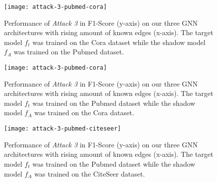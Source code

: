   \begin{figure}[h]
      \begin{center}
          \texttt{[image: attack-3-pubmed-cora]}
          \caption[Attack 3 - $D_{f_t} = Cora$ and $D_A = Pubmed$]{Performance of \emph{Attack 3} in F1-Score (y-axis) on our three GNN architectures with rising amount of known edges (x-axis). The target model $f_t$ was trained on the Cora dataset while the shadow model $f_A$ was trained on the Pubmed dataset.}
          \label{figure:eval-att3-pubmed-cora}
      \end{center}
  \end{figure}

  \begin{figure}[h]
    \begin{center}
        \texttt{[image: attack-3-pubmed-cora]}
        \caption[Attack 3 - $D_{f_t} = Pubmed$ and $D_A = Cora$]{Performance of \emph{Attack 3} in F1-Score (y-axis) on our three GNN architectures with rising amount of known edges (x-axis). The target model $f_t$ was trained on the Pubmed dataset while the shadow model $f_A$ was trained on the Cora dataset.}
        \label{figure:eval-att3-cora-pubmed}
    \end{center}
  \end{figure}

  \begin{figure}[h]
      \begin{center}
          \texttt{[image: attack-3-pubmed-citeseer]}
          \caption[Attack 3 - $D_{f_t} = Pubmed$ and $D_A = CiteSeer$]{Performance of \emph{Attack 3} in F1-Score (y-axis) on our three GNN architectures with rising amount of known edges (x-axis). The target model $f_t$ was trained on the Pubmed dataset while the shadow model $f_A$ was trained on the CiteSeer dataset.}
          \label{figure:eval-att3-citeseer-pubmed}
      \end{center}
  \end{figure}